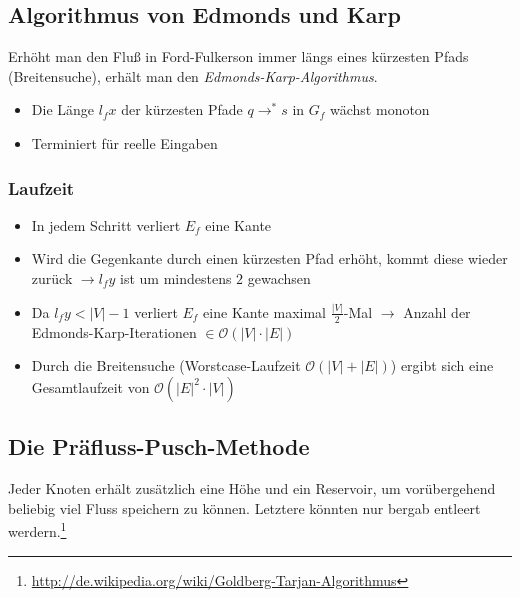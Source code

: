 \subsection{Algorithmus von Edmonds und Karp}
Erhöht man den Fluß in Ford-Fulkerson immer längs eines kürzesten Pfads (Breitensuche), erhält man den \textit{Edmonds-Karp-Algorithmus}.

\begin{itemize}
	\item Die Länge \(l_f x\) der kürzesten Pfade \(q \rightarrow^* s\) in \(G_f\) wächst monoton
	\item Terminiert für reelle Eingaben
\end{itemize}

\subsubsection{Laufzeit}
\begin{itemize}
	\item In jedem Schritt verliert \(E_f\) eine Kante
	\item Wird die Gegenkante durch einen kürzesten Pfad erhöht, kommt diese wieder zurück \(\rightarrow l_fy\) ist um mindestens \(2\) gewachsen 
	\item Da \(l_f y < |V|-1\) verliert \(E_f\) eine Kante maximal \(\frac{|V|}{2}\)-Mal \(\rightarrow\) Anzahl der Edmonds-Karp-Iterationen \(\in \mathcal{O}(|V| \cdot |E|)\)
	\item Durch die Breitensuche (Worstcase-Laufzeit \(\mathcal{O}(|V|+|E|)\)) ergibt sich eine Gesamtlaufzeit von \(\mathcal{O}(|E|^2 \cdot |V|)\)
\end{itemize}


\subsection{Die Präfluss-Pusch-Methode}
Jeder Knoten erhält zusätzlich eine Höhe und ein Reservoir, um vorübergehend beliebig viel Fluss speichern zu können. Letztere könnten nur bergab entleert werdern.\footnote{\url{http://de.wikipedia.org/wiki/Goldberg-Tarjan-Algorithmus}}

